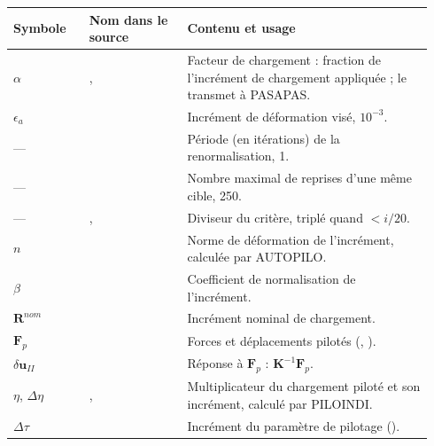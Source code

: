 \documentclass[11pt,a4paper]{article}
\makeatletter
\numberwithin{equation}{section}
\newcommand{\src}[1]{\texttt{\detokenize{#1}}}          %
\newcommand{\pr}[1]{\textsf{#1}}                        %
\newcommand{\vc}[1]{\symbf{#1}}                         %
\newenvironment{glossaire}[1][Glossaire]{%
  \par\smallskip\needspace{7\baselineskip}\noindent{\sffamily\bfseries\small #1}\par\nopagebreak
  \small
  \renewcommand{\arraystretch}{1.18}
  \begin{longtable}{@{}>{\raggedright\arraybackslash}p{0.17\linewidth}
                     >{\raggedright\arraybackslash}p{0.22\linewidth}
                     >{\raggedright\arraybackslash}p{0.555\linewidth}@{}}
  \toprule
  \textbf{Symbole} & \textbf{Nom dans le source} & \textbf{Contenu et usage}\\
  \midrule\endhead
  \bottomrule\endfoot}
  {\end{longtable}\addtocounter{table}{-1}\normalsize\vspace{-0.4em}}
\makeatother
\begin{document}
\begin{glossaire}
$\alpha$ & \src{COEPI}, \src{AUTOCOEF} & Facteur de chargement : fraction de l'incrément de chargement appliquée ; \src{AUTOCOEF} le transmet à \pr{PASAPAS}.\\
$\epsilon_a$ & \src{AUTOCRIT} & Incrément de déformation visé, $10^{-3}$.\\
— & \src{AUTORECA} & Période (en itérations) de la renormalisation, 1.\\
— & \src{AUTOPAS} & Nombre maximal de reprises d'une même cible, 250.\\
— & \src{ZAUTOREDU}, \src{RED2} & Diviseur du critère, triplé quand \src{RED2} $< i/20$.\\
$n$ & \src{U1MA} & Norme de déformation de l'incrément, calculée par \pr{AUTOPILO}.\\
$\beta$ & \src{AL1} & Coefficient de normalisation de l'incrément.\\
$\vc R^{nom}$ & \src{RESIDNOR} & Incrément nominal de chargement.\\
$\vc F_p$ & \src{ZFPILIN} & Forces et déplacements pilotés (\src{FORCES_PILOTEES}, \src{DEPLACEMENTS_PILOTES}).\\
$\delta\vc u_{II}$ & \src{ZDEPII} & Réponse à $\vc F_p$ : $\vc K^{-1}\vc F_p$.\\
$\eta$, $\Delta\eta$ & \src{ETA}, \src{D_ETA} & Multiplicateur du chargement piloté et son incrément, calculé par \pr{PILOINDI}.\\
$\Delta\tau$ & \src{DTAU} & Incrément du paramètre de pilotage (\src{PARAMETRE_DE_PILOTAGE}).\\
\end{glossaire}
\end{document}
